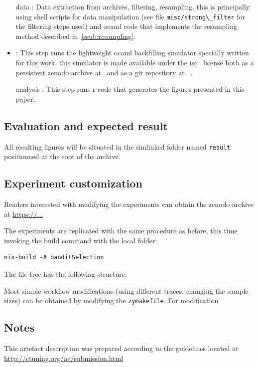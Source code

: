 \documentclass[sigconf,review]{acmart}
\begin{document}
 \begin{itemize}
   \item[data]: Data extraction from archives, filtering, resampling.
     this is principally using shell scripts for data manipulation (see file
     \lstinline[basicstyle=\ttfamily\color{blue}]|misc/strong\_filter| for the
     filtering steps used) and ocaml code that implements the resampling method
     described in~\ref{ssub:resampling}.

   \item[simulation]: This step runs the lightweight ocaml backfilling
     simulator specially written for this work. this simulator is made
     available under the isc~\cite{isc} license both as a persistent zenodo
     archive at~\cite{ocst} and as a git repository at ~\cite{ocstgit}.

   \item[analysis]: This step runs r code that generates the figures
     presented in this paper.
 \end{itemize}


\subsection{Evaluation and expected result}

All resulting figures will be situated in the simlinked folder named
\lstinline[basicstyle=\ttfamily\color{blue}]|result| positionned at the root of
the archive.

\subsection{Experiment customization}

Readers interested with modifying the experiments can obtain the zenodo archive
at \url{https://...}

The experiments are replicated with the same procedure as before, this time
invoking the build command with the local folder:

\begin{lstlisting}
nix-build -A banditSelection
\end{lstlisting}

The file tree has the following structure:


Most simple workflow modifications (using different traces, changing the sample
sizes) can be obtained by modifying the
\lstinline[basicstyle=\ttfamily\color{blue}]|zymakefile|. For modification

\subsection{Notes}

This artefact description was prepared according to the guidelines located at
\url{http://ctuning.org/ae/submission.html}
\end{document}
